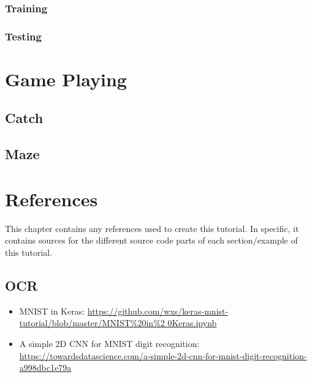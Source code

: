 \documentclass[10pt,twoside,a4paper,openany]{memoir}
\renewcommand*{\printchaptertitle}[1]{\vspace{-2.5cm}\chaptitlefont\thechapter.\ ##1\vspace{-1cm}}
\begin{document}
\subsection{Training}


\subsection{Testing}


\chapter{Game Playing}
\section{Catch}


\newpage
\section{Maze}


\backmatter

\renewcommand*{\printchaptertitle}[1]{\chaptitlefont#1}
\chapter*{References}
This chapter contains any references used to create this tutorial.
In specific, it contains sources for the different source
code parts of each section/example of this tutorial.

\section{OCR}
\begin{itemize}
\item MNIST in Keras: \href{https://github.com/wxs/keras-mnist-tutorial/blob/master/MNIST\%20in\%20Keras.ipynb}{https://github.com/wxs/keras-mnist-tutorial/blob/master/MNIST\%20in\%2 0Keras.ipynb}
\item A simple 2D CNN for MNIST digit recognition: \href{https://towardsdatascience.com/a-simple-2d-cnn-for-mnist-digit-recognition-a998dbc1e79a}{https://towardsdatascience.com/a-simple-2d-cnn-for-mnist-digit-recognition-a998dbc1e79a}
\end{itemize}
\end{document}
